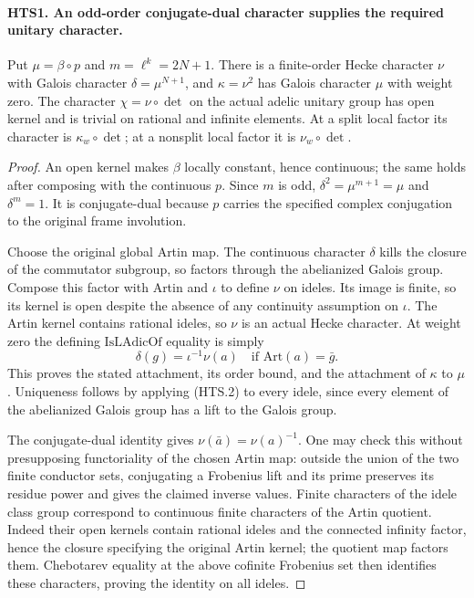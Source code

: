 \documentclass[11pt,a4paper]{article}
\numberwithin{equation}{section}
\theoremstyle{remark}\newtheorem{remark}[theorem]{Remark}
\begin{document}
\paragraph{HTS1. An odd-order conjugate-dual character supplies the required unitary character.}
\label{claim:HTS1}
Put $\mu=\beta\circ p$ and $m=\ell^k=2N+1$.  There is a
finite-order Hecke character $\nu$ with Galois character
$\delta=\mu^{N+1}$, and $\kappa=\nu^2$ has Galois character
$\mu$ with weight zero.  The character
$\chi=\nu\circ\det$ on the actual adelic unitary group has
open kernel and is trivial on rational and infinite elements.
At a split local factor its character is $\kappa_w\circ\det$;
at a nonsplit local factor it is $\nu_w\circ\det$.
\begin{proof}
An open kernel makes $\beta$ locally constant, hence continuous;
the same holds after composing with the continuous $p$.
Since $m$ is odd, $\delta^2=\mu^{m+1}=\mu$ and $\delta^m=1$.
It is conjugate-dual because $p$ carries the specified complex
conjugation to the original frame involution.

Choose the original global Artin map.  The continuous character
$\delta$ kills the closure of the commutator subgroup, so factors
through the abelianized Galois group.  Compose this factor with
Artin and $\iota$ to define $\nu$ on ideles.  Its image is finite,
so its kernel is open despite the absence of any continuity
assumption on $\iota$.  The Artin kernel contains rational
ideles, so $\nu$ is an actual Hecke character.  At weight zero
the defining $\mathrm{IsLAdicOf}$ equality is simply
\[
         \delta(g)=\iota^{-1}\nu(a)
                       \quad\text{if }\mathrm{Art}(a)=\bar g.
                                                               \tag{HTS.2}
\]
This proves the stated attachment, its order bound, and the
attachment of $\kappa$ to $\mu$.  Uniqueness follows by applying
(HTS.2) to every idele, since every element of the abelianized
Galois group has a lift to the Galois group.

The conjugate-dual identity gives $\nu(\bar a)=\nu(a)^{-1}$.
One may check this without presupposing functoriality of the
chosen Artin map: outside the union of the two finite conductor
sets, conjugating a Frobenius lift and its prime preserves its
residue power and gives the claimed inverse values.  Finite
characters of the idele class group correspond to continuous
finite characters of the Artin quotient.  Indeed their open
kernels contain rational ideles and the connected infinity
factor, hence the closure specifying the original Artin kernel;
the quotient map factors them.  Chebotarev equality at the above
cofinite Frobenius set then identifies these characters, proving
the identity on all ideles.


\end{proof}
\end{document}
